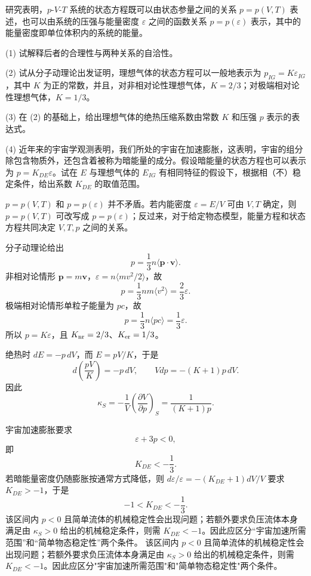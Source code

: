 \begin{question}
研究表明，$p$-$V$-$T$ 系统的状态方程既可以由状态参量之间的关系 $p=p(V,T)$ 表述，也可以由系统的压强与能量密度 $\varepsilon$ 之间的函数关系 $p=p(\varepsilon)$ 表示，其中的能量密度即单位体积内的系统的能量。

(1) 试解释后者的合理性与两种关系的自洽性。

(2) 试从分子动理论出发证明，理想气体的状态方程可以一般地表示为 $p_{IG}=K\varepsilon_{IG}$，其中 $K$ 为正的常数，并且，对非相对论性理想气体，$K=2/3$；对极端相对论性理想气体，$K=1/3$。

(3) 在 (2) 的基础上，给出理想气体的绝热压缩系数由常数 $K$ 和压强 $p$ 表示的表达式。

(4) 近年来的宇宙学观测表明，我们所处的宇宙在加速膨胀，这表明，宇宙的组分除包含物质外，还包含着被称为暗能量的成分。假设暗能量的状态方程也可以表示为 $p=K_{DE}\varepsilon$。试在 $E$ 与理想气体的 $E_{IG}$ 有相同特征的假设下，根据相（不）稳定条件，给出系数 $K_{DE}$ 的取值范围。
\begin{solution}
$p=p(V,T)$ 和 $p=p(\varepsilon)$ 并不矛盾。若内能密度 $\varepsilon=E/V$ 可由 $V,T$ 确定，则 $p=p(V,T)$ 可改写成 $p=p(\varepsilon)$；反过来，对于给定物态模型，能量方程和状态方程共同决定 $V,T,p$ 之间的关系。

分子动理论给出
\[
p=\frac13 n\langle \mathbf p\cdot\mathbf v\rangle.
\]
非相对论情形 $\mathbf p=m\mathbf v$，$\varepsilon=n\langle mv^2/2\rangle$，故
\[
p=\frac13nm\langle v^2\rangle=\frac23\varepsilon.
\]
极端相对论情形单粒子能量为 $pc$，故
\[
p=\frac13 n\langle pc\rangle=\frac13\varepsilon.
\]
所以 $p=K\varepsilon$，且 $K_{\rm nr}=2/3$、$K_{\rm er}=1/3$。

绝热时 $dE=-p\,dV$，而 $E=pV/K$，于是
\[
d\left(\frac{pV}{K}\right)=-p\,dV,
\qquad
Vdp=-(K+1)p\,dV.
\]
因此
\[
\kappa_S=-\frac1V\left(\frac{\partial V}{\partial p}\right)_S
=\frac1{(K+1)p}.
\]

宇宙加速膨胀要求
\[
\varepsilon+3p<0,
\]
即
\[
K_{DE}<-\frac13.
\]
若暗能量密度仍随膨胀按通常方式降低，则 $d\varepsilon/\varepsilon=-(K_{DE}+1)dV/V$ 要求 $K_{DE}>-1$，于是
\[
-1<K_{DE}<-\frac13.
\]
该区间内 $p<0$ 且简单流体的机械稳定性会出现问题；若额外要求负压流体本身满足由 $\kappa_S>0$ 给出的机械稳定条件，则需 $K_{DE}<-1$。因此应区分“宇宙加速所需范围”和“简单物态稳定性”两个条件。
该区间内 $p<0$ 且简单流体的机械稳定性会出现问题；若额外要求负压流体本身满足由 $\kappa_S>0$ 给出的机械稳定条件，则需 $K_{DE}<-1$。因此应区分"宇宙加速所需范围"和"简单物态稳定性"两个条件。
\end{solution}
\end{question}

